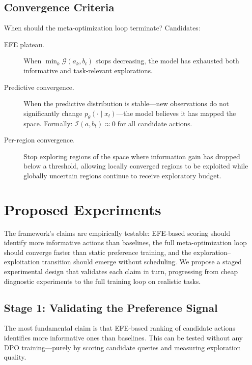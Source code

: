 \documentclass[11pt]{article}
\newcommand{\EFE}{\mathcal{G}}
\begin{document}
\subsection{Convergence Criteria}

When should the meta-optimization loop terminate? Candidates:

\begin{description}
    \item[EFE plateau.] When $\min_k \EFE(a_k, b_t)$ stops decreasing, the model has exhausted both informative and task-relevant explorations.
    \item[Predictive convergence.] When the predictive distribution is stable---new observations do not significantly change $p_\theta(\cdot \mid x_t)$---the model believes it has mapped the space. Formally: $\mathcal{I}(a, b_t) \approx 0$ for all candidate actions.
    \item[Per-region convergence.] Stop exploring regions of the space where information gain has dropped below a threshold, allowing locally converged regions to be exploited while globally uncertain regions continue to receive exploratory budget.
\end{description}



\section{Proposed Experiments}
\label{sec:experiments}

The framework's claims are empirically testable: EFE-based scoring should identify more informative actions than baselines, the full meta-optimization loop should converge faster than static preference training, and the exploration--exploitation transition should emerge without scheduling. We propose a staged experimental design that validates each claim in turn, progressing from cheap diagnostic experiments to the full training loop on realistic tasks.


\subsection{Stage 1: Validating the Preference Signal}
\label{sec:exp-stage1}

The most fundamental claim is that EFE-based ranking of candidate actions identifies more informative ones than baselines. This can be tested without any DPO training---purely by scoring candidate queries and measuring exploration quality.
\end{document}
